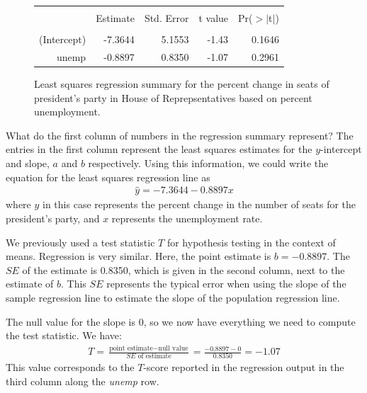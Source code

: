 \begin{figure}[h]
\centering
\begin{tabular}{rrrrr}
  \hline
  \vspace{-3.7mm} & & & & \\
 & Estimate & Std. Error & t value & Pr($>$$|$t$|$) \\ 
  \hline
  \vspace{-3.6mm} & & & & \\
(Intercept) & -7.3644  & 5.1553 & -1.43 & 0.1646\\ 
unemp & -0.8897 & 0.8350 & -1.07 & 0.2961 \\ 
   \hline
\end{tabular}
\caption{Least squares regression summary for the percent change in seats of president's party in House of Reprepsentatives based on percent unemployment.}
\label{midtermElectionUnemploymentRRegressionOutput}
\end{figure}




\begin{examplewrap}
\begin{nexample}{What do the first column of numbers in the regression summary represent?}
The entries in the first column represent the least squares estimates for the $y$-intercept and slope, $a$ and $b$ respectively.  Using this information, we could write the equation
  for the least squares regression line as
  \begin{align*}
  \hat{y} = -7.3644 - 0.8897 x
  \end{align*}
  where $y$ in this case represents the percent change in the number
  of seats for the president's party,
  and $x$ represents the unemployment rate.
\end{nexample}
\end{examplewrap}

We previously used a test statistic $T$ for hypothesis testing in the context of means. Regression is very similar. Here, the point estimate is $b=-0.8897$.  The $SE$ of the estimate is 0.8350, which is given in the second column, next to the estimate of $b$.  This $SE$ represents the typical error when using the slope of the sample regression line to estimate the slope of the population regression line.

The null value for the slope is 0, so we now have everything we need to compute the test statistic.  We have: 
\begin{align*}
T = \frac{\text{point estimate} - \text{null value}}{SE \text{ of estimate}} = \frac{-0.8897 - 0}{0.8350} = -1.07
\end{align*}
This value corresponds to the $T$-score reported in the regression output in the third column along the \emph{unemp} row.  

